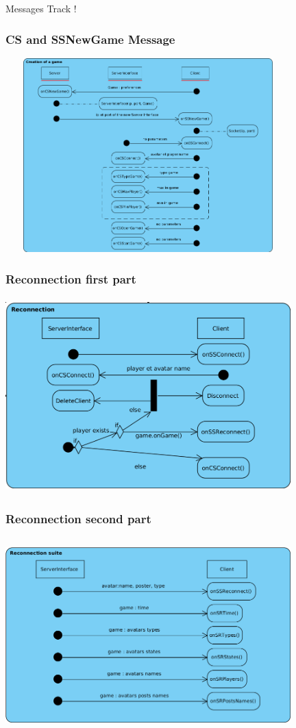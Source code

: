 \documentclass[9pt]{beamer}
\begin{document}
\begin{frame}
	\begin{Huge}
		Messages Track !
	\end{Huge}
\end{frame}


\begin{frame}
	\frametitle{CS and SSNewGame Message}
 	\centerline{ \includegraphics[width=11cm, height=7.5cm]{gamecreation.png}}
	\transdissolve
\end{frame}

\begin{frame}
	\frametitle{Reconnection first part}
 	\centerline{ \includegraphics[width=11cm, height=7.5cm]{reconnection.png}}
	\transdissolve
\end{frame}

\begin{frame}
	\frametitle{Reconnection second part}
 	\centerline{ \includegraphics[width=11cm, height=7.5cm]{reconnectionsuite.png}}
	\transdissolve
\end{frame}
\end{document}
